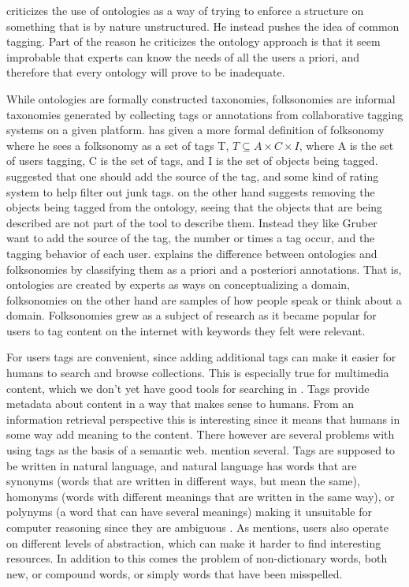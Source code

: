 \citet{Shirky2007} criticizes the use of ontologies as a way of trying to enforce a structure on something that is by nature unstructured.
He instead pushes the idea of common tagging.
Part of the reason he criticizes the ontology approach is that it seem improbable that experts can know the needs of all the users a priori, and therefore that every ontology will prove to be inadequate.

While ontologies are formally constructed taxonomies, folksonomies are informal taxonomies generated by collecting tags or annotations from collaborative tagging systems on a given platform\citep{Tang2009}.
\citet{Mika2005} has given a more formal definition of folksonomy where he sees a folksonomy as a set of tags T,
$T \subseteq A \times C \times I$, where A is the set of users tagging, C is the set of tags, and I is the set of objects being tagged.
\citet{Gruber2007} suggested that one should add the source of the tag, and some kind of rating system to help filter out junk tags.
\citet{Scerri2008} on the other hand suggests removing the objects being tagged from the ontology,
seeing that the objects that are being described are not part of the tool to describe them.
Instead they like Gruber want to add the source of the tag, the number or times a tag occur, and the tagging behavior of each user.
\citet{Bang2008} explains the difference between ontologies and folksonomies by classifying them as a priori and a posteriori annotations.
That is, ontologies are created by experts as ways on conceptualizing a domain, folksonomies on the other hand are samples of how people speak or think about a domain.
Folksonomies grew as a subject of research as it became popular for users to tag content on the internet with keywords they felt were relevant.

For users tags are convenient, since adding additional tags can make it easier for humans to search and browse collections.
This is especially true for multimedia content, which we don't yet have good tools for searching in \citep{Weinberger2008}.
Tags provide metadata about content in a way that makes sense to humans.
From an information retrieval perspective this is interesting since it means that humans in some way add meaning to the content.
There however are several problems with using tags as the basis of a semantic web.
\citet{Tang2009} mention several.
Tags are supposed to be written in natural language, and natural language has words that are synonyms (words that are written in different ways,
but mean the same), homonyms (words with different meanings that are written in the same way), or polynyms (a word that can have several meanings)
making it unsuitable for computer reasoning since they are ambiguous \citep{Passant2008}.
As \citet{Golder2005} mentions, users also operate on different levels of abstraction, which can make it harder to find interesting resources.
In addition to this comes the problem of non-dictionary words, both new, or compound words, or simply words that have been misspelled\citep{Tonkin2006}.


